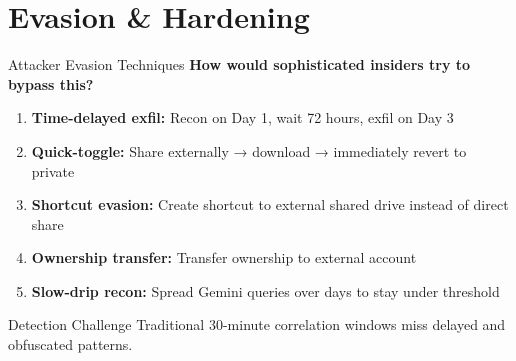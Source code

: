\documentclass[aspectratio=169]{beamer}
\begin{document}
\section{Evasion \& Hardening}

\begin{frame}{Attacker Evasion Techniques}
\textbf{How would sophisticated insiders try to bypass this?}

\vspace{1em}

\begin{enumerate}
    \item \textbf{Time-delayed exfil:} Recon on Day 1, wait 72 hours, exfil on Day 3
    \item \textbf{Quick-toggle:} Share externally → download → immediately revert to private
    \item \textbf{Shortcut evasion:} Create shortcut to external shared drive instead of direct share
    \item \textbf{Ownership transfer:} Transfer ownership to external account
    \item \textbf{Slow-drip recon:} Spread Gemini queries over days to stay under threshold
\end{enumerate}

\vspace{1em}

\begin{alertblock}{Detection Challenge}
Traditional 30-minute correlation windows miss delayed and obfuscated patterns.
\end{alertblock}
\end{frame}
\end{document}

